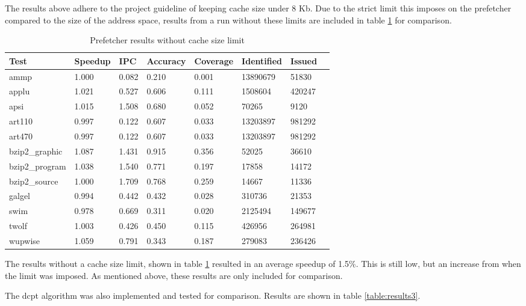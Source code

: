 The results above adhere to the project guideline of keeping cache size under 8 Kb. Due to the strict limit this imposes on the prefetcher compared to the size of the address space, results from a run without these limits are included in table \ref{table:results2} for comparison.

\begin{table}[!t]
\renewcommand{\arraystretch}{1.3}
\caption{Prefetcher results without cache size limit}
\label{table:results2}
\centering
\begin{tabular}{|l|l|l|l|l|l|l|l|}
\hline
\bfseries Test & \bfseries Speedup & \bfseries IPC & \bfseries Accuracy & \bfseries Coverage & \bfseries Identified & \bfseries Issued\\
\hline
\hline
ammp 		& 1.000  &	0.082 &	0.210 &	0.001 &	13890679 &	51830\\
applu 		& 1.021 & 	0.527 &	0.606 &	0.111 &	1508604 & 	420247\\
apsi 		& 1.015 & 	1.508 &	0.680 &	0.052 &	70265 &	9120\\	
art110 		& 0.997 & 	0.122 &	0.607 &	0.033 &	13203897 &	981292\\	
art470 		& 0.997 & 	0.122 &	0.607 &	0.033 &	13203897 &	981292\\
bzip2\_graphic 	& 1.087 & 	1.431 &	0.915 &	0.356 &	52025 &	36610\\
bzip2\_program 	& 1.038 & 	1.540 &	0.771 &	0.197 &	17858 &	14172 	\\
bzip2\_source 	& 1.000 & 	1.709 &	0.768 &	0.259 &	14667 &	11336\\
galgel 		& 0.994 & 	0.442 &	0.432 &	0.028 &	310736 & 21353\\
swim 		& 0.978 & 	0.669 &	0.311 &	0.020 &	2125494 & 	149677\\
twolf 		& 1.003 & 	0.426 &	0.450 &	0.115 &	426956 & 	264981	\\
wupwise 	& 1.059 & 	0.791 &	0.343 &	0.187 &	279083 & 	236426\\
\hline
\end{tabular}
\end{table}

The results without a cache size limit, shown in table \ref{table:results2} resulted in an average speedup of 1.5\%. This is still low, but an increase from when the limit was imposed. As mentioned above, these results are only included for comparison.

The dcpt algorithm was also implemented and tested for comparison. Results are shown in table \ref{table:results3}.

